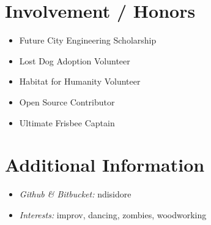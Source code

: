 \documentclass[10pt]{article}
\begin{document}
\section*{Involvement / Honors}
\begin{multicols}{3}
  \begin{itemize}
    \item Future City Engineering Scholarship
    \item Lost Dog Adoption Volunteer
    \item Habitat for Humanity Volunteer
    \item Open Source Contributor
    \item Ultimate Frisbee Captain
  \end{itemize}
\end{multicols}

\enlargethispage{3\baselineskip}

\section*{Additional Information}
\begin{multicols}{2}
  \begin{itemize}
    \item \textit{Github \& Bitbucket:} ndisidore
    \item \textit{Interests:} improv, dancing, zombies, woodworking
  \end{itemize}
\end{multicols}
\end{document}

